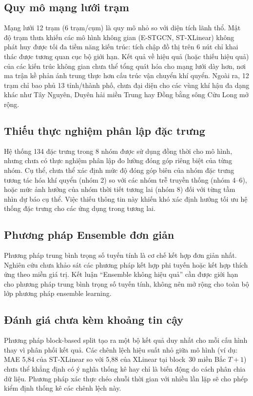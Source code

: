 \subsection{Quy mô mạng lưới trạm}

Mạng lưới 12 trạm (6 trạm/cụm) là quy mô nhỏ so với diện tích lãnh thổ. Mật độ trạm thưa khiến các mô hình không gian (E-STGCN, ST-XLinear) không phát huy được tối đa tiềm năng kiến trúc: tích chập đồ thị trên 6 nút chỉ khai thác được tương quan cục bộ giới hạn. Kết quả về hiệu quả (hoặc thiếu hiệu quả) của các kiến trúc không gian chưa thể tổng quát hóa cho mạng lưới dày hơn, nơi ma trận kề phản ánh trung thực hơn cấu trúc vận chuyển khí quyển. Ngoài ra, 12 trạm chỉ bao phủ 13 tỉnh/thành phố, chưa đại diện cho các vùng khí hậu đa dạng khác như Tây Nguyên, Duyên hải miền Trung hay Đồng bằng sông Cửu Long mở rộng.

\subsection{Thiếu thực nghiệm phân lập đặc trưng}

Hệ thống 134 đặc trưng trong 8 nhóm được sử dụng đồng thời cho mô hình, nhưng chưa có thực nghiệm phân lập đo lường đóng góp riêng biệt của từng nhóm. Cụ thể, chưa thể xác định mức độ đóng góp biên của nhóm đặc trưng tương tác hóa khí quyển (nhóm 2) so với các nhóm trễ truyền thống (nhóm 4--6), hoặc mức ảnh hưởng của nhóm thời tiết tương lai (nhóm 8) đối với từng tầm nhìn dự báo cụ thể. Việc thiếu thông tin này khiến khó xác định hướng tối ưu hệ thống đặc trưng cho các ứng dụng trong tương lai.

\subsection{Phương pháp Ensemble đơn giản}

Phương pháp trung bình trọng số tuyến tính là cơ chế kết hợp đơn giản nhất. Nghiên cứu chưa khảo sát các phương pháp kết hợp phi tuyến hoặc kết hợp thích ứng theo miền giá trị. Kết luận ``Ensemble không hiệu quả'' cần được giới hạn cho phương pháp trung bình trọng số tuyến tính, không nên mở rộng cho toàn bộ lớp phương pháp ensemble learning.

\subsection{Đánh giá chưa kèm khoảng tin cậy}

Phương pháp block-based split tạo ra một bộ kết quả duy nhất cho mỗi cấu hình thay vì phân phối kết quả. Các chênh lệch hiệu suất nhỏ giữa mô hình (ví dụ: MAE 5,84 của ST-XLinear so với 5,88 của XLinear tại block~30 miền Bắc $T{+}1$) chưa thể khẳng định có ý nghĩa thống kê hay chỉ là biến động do cách phân chia dữ liệu. Phương pháp xác thực chéo chuỗi thời gian với nhiều lần lặp sẽ cho phép kiểm định thống kê các chênh lệch này.

